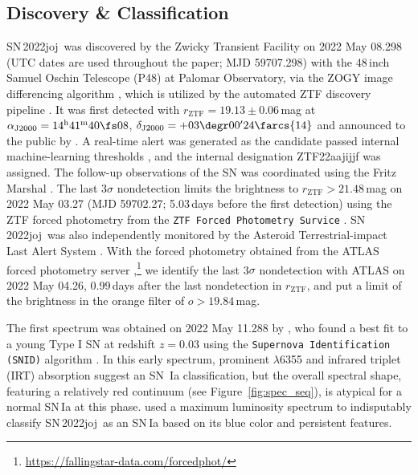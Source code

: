 \documentclass[twocolumn]{aastex631}
\newcommand{\sn}{SN\,2022joj}
\begin{document}
\begin{CJK*}{UTF8}{gbsn}
\subsection{Discovery \& Classification}
\sn\ was discovered by the Zwicky Transient Facility \citep[ZTF;][]{Bellm_ZTF_2019a,Graham_ZTF_2019,Dekany_ZTF_2020} on 2022 May 08.298 (UTC dates are used throughout the paper; MJD 59707.298) with the 48\,inch Samuel Oschin Telescope (P48) at Palomar Observatory, via the ZOGY image differencing algorithm \citep{Zackay_imagesub_2016}, which is utilized by the automated ZTF discovery pipeline \citep{Masci_ZTF_2019}. It was first detected with $r_\mathrm{ZTF}=19.13\pm0.06$\,mag at $\alpha_\mathrm{J2000}=14^\mathrm{h}41^\mathrm{m}40\fs08$, $\delta_\mathrm{J2000}=+03\degr00'24\farcs{14}$ and announced to the public by \citet{Fremling_2022TNSTR}. A real-time alert \citep{Patterson_ZTFalert_2019} was generated as the candidate passed internal machine-learning thresholds \citep[e.g.,][]{Duev_ZTFML_2019,Mahabal_ZTFML_2019}, and the internal designation ZTF22aajijjf was assigned. The follow-up observations of the SN was coordinated using the Fritz Marshal \citep{van_der_Walt_skyportal_2019,Coughlin_skyportal_2023}. The last 3$\sigma$ nondetection limits the brightness to $r_\mathrm{ZTF}>21.48$\,mag on 2022 May 03.27 (MJD 59702.27; 5.03\,days before the first detection) using the ZTF forced photometry from the \texttt{ZTF Forced Photometry Survice} \citep[\texttt{ZFPS};][]{Masci_ZTFforced_2023}. \sn\ was also independently monitored by the Asteroid Terrestrial-impact Last Alert System \citep[ATLAS;][]{ATLAS_2018,ATLAS_2020}. With the forced photometry obtained from the ATLAS forced photometry server \citep{ATLAS_forced_phot_2021},\footnote{\url{https://fallingstar-data.com/forcedphot/}} we identify the last 3$\sigma$ nondetection with ATLAS on 2022 May 04.26, 0.99\,days after the last nondetection in $r_\mathrm{ZTF}$, and put a limit of the brightness in the orange filter of $o>19.84$\,mag.

The first spectrum was obtained on 2022 May 11.288 by \citet{Newsome_2022TNSCR}, who found a best fit to a young Type I SN at redshift $z=0.03$ using the \texttt{Supernova Identification (SNID)} algorithm \citep{Blondin_SNID_2007}. In this early spectrum, prominent  $\lambda$6355 and  infrared triplet (IRT) absorption suggest an SN \,Ia classification, but the overall spectral shape, featuring a relatively red continuum (see Figure~\ref{fig:spec_seq}), is atypical for a normal SN\,Ia at this phase. \citet{Chu_2022TNSCR} used a maximum luminosity spectrum to indisputably classify \sn\ as an SN\,Ia based on its blue color and persistent  features.


\end{CJK*}
\end{document}
